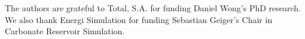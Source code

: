 \documentclass[draft]{agujournal2018}
\begin{document}
%
%
%
%
%
%
%
%


\acknowledgments
The authors are grateful to Total, S.A. for funding Daniel Wong's PhD research. We also thank Energi Simulation for funding Sebastian Geiger's Chair in Carbonate Reservoir Simulation. 



%
% 
%





\end{document}
